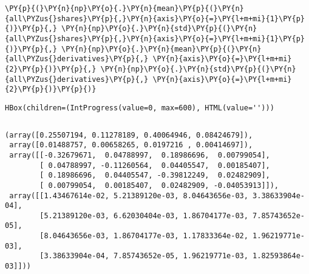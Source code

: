 \begin{tcolorbox}[breakable, size=fbox, boxrule=1pt, pad at break*=1mm,colback=cellbackground, colframe=cellborder]
\begin{Verbatim}[commandchars=\\\{\}]
\PY{p}{(}\PY{n}{np}\PY{o}{.}\PY{n}{mean}\PY{p}{(}\PY{n}{all\PYZus{}shares}\PY{p}{,}\PY{n}{axis}\PY{o}{=}\PY{l+m+mi}{1}\PY{p}{)}\PY{p}{,} \PY{n}{np}\PY{o}{.}\PY{n}{std}\PY{p}{(}\PY{n}{all\PYZus{}shares}\PY{p}{,}\PY{n}{axis}\PY{o}{=}\PY{l+m+mi}{1}\PY{p}{)}\PY{p}{,} \PY{n}{np}\PY{o}{.}\PY{n}{mean}\PY{p}{(}\PY{n}{all\PYZus{}derivatives}\PY{p}{,} \PY{n}{axis}\PY{o}{=}\PY{l+m+mi}{2}\PY{p}{)}\PY{p}{,} \PY{n}{np}\PY{o}{.}\PY{n}{std}\PY{p}{(}\PY{n}{all\PYZus{}derivatives}\PY{p}{,} \PY{n}{axis}\PY{o}{=}\PY{l+m+mi}{2}\PY{p}{)}\PY{p}{)}
\end{Verbatim}
\end{tcolorbox}


    \begin{verbatim}
HBox(children=(IntProgress(value=0, max=600), HTML(value='')))
    \end{verbatim}


    \begin{Verbatim}[commandchars=\\\{\}]

    \end{Verbatim}

            \begin{tcolorbox}[breakable, size=fbox, boxrule=.5pt, pad at break*=1mm, opacityfill=0]
\begin{Verbatim}[commandchars=\\\{\}]
(array([0.25507194, 0.11278189, 0.40064946, 0.08424679]),
 array([0.01488757, 0.00658265, 0.0197216 , 0.00414697]),
 array([[-0.32679671,  0.04788997,  0.18986696,  0.00799054],
        [ 0.04788997, -0.11260564,  0.04405547,  0.00185407],
        [ 0.18986696,  0.04405547, -0.39812249,  0.02482909],
        [ 0.00799054,  0.00185407,  0.02482909, -0.04053913]]),
 array([[1.43467614e-02, 5.21389120e-03, 8.04643656e-03, 3.38633904e-04],
        [5.21389120e-03, 6.62030404e-03, 1.86704177e-03, 7.85743652e-05],
        [8.04643656e-03, 1.86704177e-03, 1.17833364e-02, 1.96219771e-03],
        [3.38633904e-04, 7.85743652e-05, 1.96219771e-03, 1.82593864e-03]]))
\end{Verbatim}
\end{tcolorbox}

